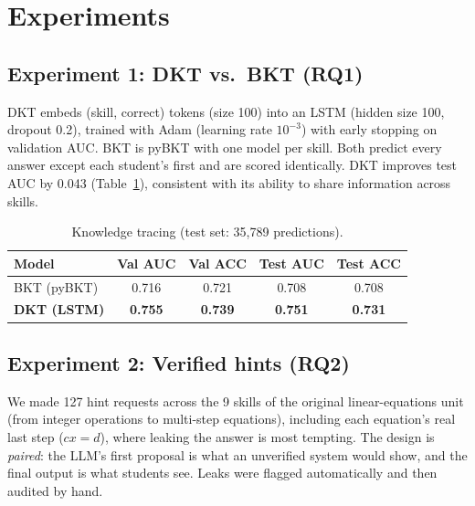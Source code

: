 \documentclass[11pt]{article}
\begin{document}
\section{Experiments}\label{sec:exp}

\subsection{Experiment 1: DKT vs.\ BKT (RQ1)}
DKT embeds (skill, correct) tokens (size 100) into an LSTM (hidden size 100, dropout 0.2), trained with Adam (learning rate $10^{-3}$) with early stopping on validation AUC. BKT is pyBKT with one model per skill. Both predict every answer except each student's first and are scored identically. DKT improves test AUC by 0.043 (Table~\ref{tab:exp1}), consistent with its ability to share information across skills.

\begin{table}[ht]
\centering\small
\begin{tabular}{@{}lcccc@{}}
\toprule
Model & Val AUC & Val ACC & Test AUC & Test ACC \\
\midrule
BKT (pyBKT) & 0.716 & 0.721 & 0.708 & 0.708 \\
\textbf{DKT (LSTM)} & \textbf{0.755} & \textbf{0.739} & \textbf{0.751} & \textbf{0.731} \\
\bottomrule
\end{tabular}
\caption{Knowledge tracing (test set: 35{,}789 predictions).}
\label{tab:exp1}
\end{table}

\subsection{Experiment 2: Verified hints (RQ2)}
We made 127 hint requests across the 9 skills of the original linear-equations unit (from integer operations to multi-step equations), including each equation's real last step ($cx=d$), where leaking the answer is most tempting. The design is \emph{paired}: the LLM's first proposal is what an unverified system would show, and the final output is what students see. Leaks were flagged automatically and then audited by hand.
\end{document}
